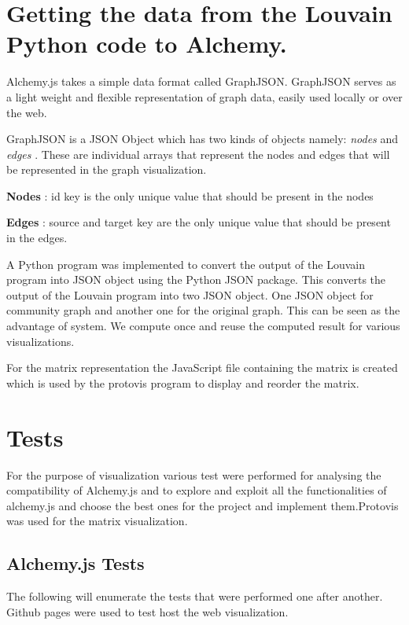 \section{Getting the data from the Louvain Python code to Alchemy. }
 Alchemy.js takes a simple data format called GraphJSON. GraphJSON serves as a light weight and flexible representation of graph data, easily used locally or over the web. 
\par 
GraphJSON is a JSON Object which has two kinds of objects namely: \textit{nodes} and  \textit{edges} . These are individual arrays that represent the nodes and edges that will be represented in the graph visualization. 
\par \textbf{Nodes} : id key is the only unique value that should be present in the nodes
\par \textbf{Edges} : source and target key are the only unique value that should be present in the edges.
\par A Python program was implemented to convert the output of the Louvain program into JSON object using the Python JSON package. This converts the output of the Louvain program into two JSON object. One JSON object for community graph and another one for the original graph.
This can be seen as the advantage of system. We compute once and reuse the computed result for various visualizations.
\par For the matrix representation the JavaScript file containing the matrix is created which is used by the protovis program to display and reorder the matrix.

\section{Tests}
For the purpose of visualization various test were performed for analysing the compatibility of Alchemy.js and to explore and exploit all the functionalities of alchemy.js and choose the best ones for the project and implement them.Protovis was used for the matrix visualization.
\subsection{Alchemy.js Tests}
The following will enumerate the tests that were performed one after another. Github pages were used to test host the web visualization.


